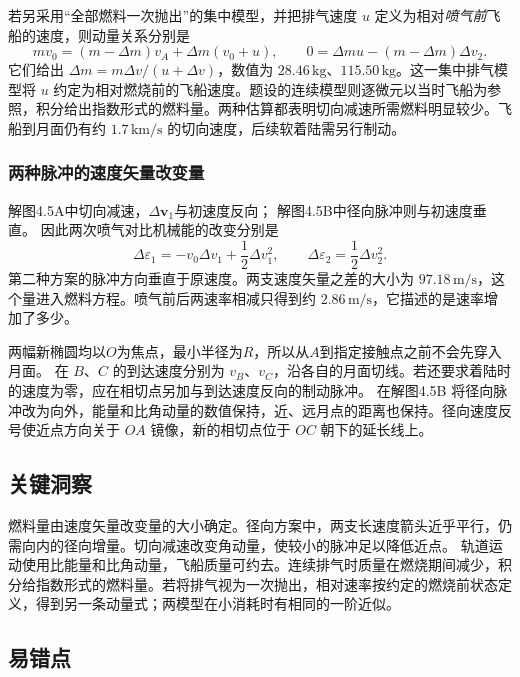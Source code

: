 \documentclass[UTF8,fontset=fandol,a4paper,11pt]{ctexart}
\newcommand{\vect}[1]{\bm{#1}}
\begin{document}
若另采用“全部燃料一次抛出”的集中模型，并把排气速度 $u$ 定义为相对\emph{喷气前}飞船的速度，则动量关系分别是
\[
mv_0=(m-\Delta m)v_A+\Delta m(v_0+u),\qquad
0=\Delta m u-(m-\Delta m)\Delta v_2.
\]
它们给出 $\Delta m=m\Delta v/(u+\Delta v)$，数值为 $28.46\,\mathrm{kg}$、$115.50\,\mathrm{kg}$。这一集中排气模型将 $u$ 约定为相对燃烧前的飞船速度。题设的连续模型则逐微元以当时飞船为参照，积分给出指数形式的燃料量。两种估算都表明切向减速所需燃料明显较少。飞船到月面仍有约 $1.7\,\mathrm{km/s}$ 的切向速度，后续软着陆需另行制动。
\subsubsection*{两种脉冲的速度矢量改变量}
解图4.5A中切向减速，$\Delta\vect v_1$与初速度反向；
解图4.5B中径向脉冲则与初速度垂直。
因此两次喷气对比机械能的改变分别是
\[
\Delta\varepsilon_1=-v_0\Delta v_1+\frac12\Delta v_1^2,
\qquad
\Delta\varepsilon_2=\frac12\Delta v_2^2.
\]
第二种方案的脉冲方向垂直于原速度。两支速度矢量之差的大小为 $97.18\,\mathrm{m/s}$，这个量进入燃料方程。喷气前后两速率相减只得到约 $2.86\,\mathrm{m/s}$，它描述的是速率增加了多少。

两幅新椭圆均以$O$为焦点，最小半径为$R$，所以从$A$到指定接触点之前不会先穿入月面。
在 $B$、$C$ 的到达速度分别为 $v_B$、$v_C$，沿各自的月面切线。若还要求着陆时的速度为零，应在相切点另加与到达速度反向的制动脉冲。
在解图4.5B 将径向脉冲改为向外，能量和比角动量的数值保持，近、远月点的距离也保持。径向速度反号使近点方向关于 $OA$ 镜像，新的相切点位于 $OC$ 朝下的延长线上。




\subsection*{关键洞察}

燃料量由速度矢量改变量的大小确定。径向方案中，两支长速度箭头近乎平行，仍需向内的径向增量。切向减速改变角动量，使较小的脉冲足以降低近点。
轨道运动使用比能量和比角动量，飞船质量可约去。连续排气时质量在燃烧期间减少，积分给指数形式的燃料量。若将排气视为一次抛出，相对速率按约定的燃烧前状态定义，得到另一条动量式；两模型在小消耗时有相同的一阶近似。



\subsection*{易错点}
\end{document}
